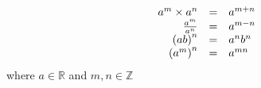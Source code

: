  
    \begin{equation}
    \begin{array}{ccl} \hfill {a}^{m}\ensuremath{\times}{a}^{n}& =& {a}^{m+n}\hfill \\ \hfill \frac{{a}^{m}}{{a}^{n}}& =& {a}^{m-n}\hfill \\ \hfill {\left(ab\right)}^{n}& =& {a}^{n}{b}^{n}\hfill \\ \hfill {\left({a}^{m}\right)}^{n}& =& {a}^{mn}\hfill \end{array}
      \end{equation}
where $a \in \mathbb{R}$ and $m,n \in \mathbb{Z}$

% 
%           

